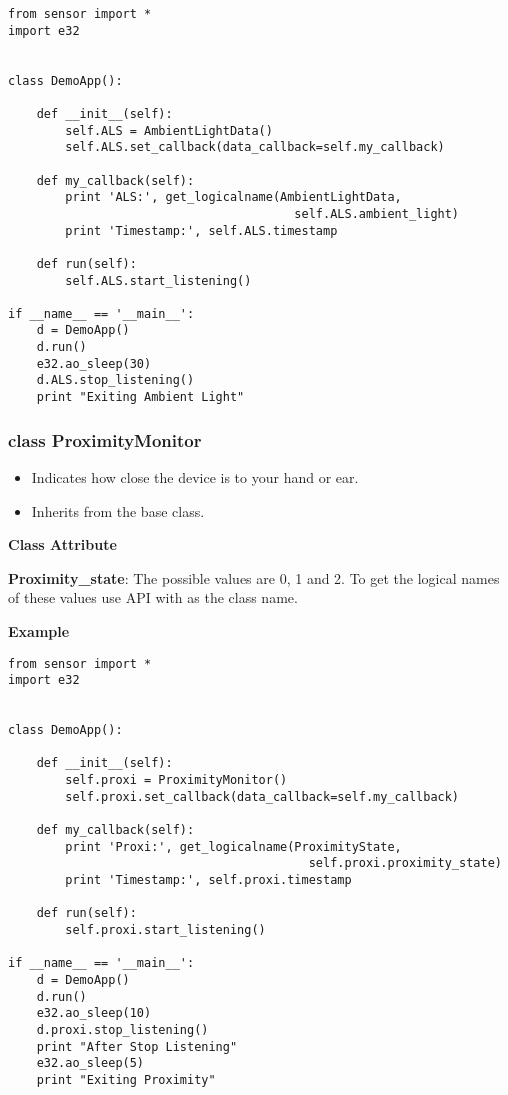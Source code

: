 \begin{verbatim}
from sensor import *
import e32


class DemoApp():

    def __init__(self):
        self.ALS = AmbientLightData()
        self.ALS.set_callback(data_callback=self.my_callback)

    def my_callback(self):
        print 'ALS:', get_logicalname(AmbientLightData,
                                        self.ALS.ambient_light)
        print 'Timestamp:', self.ALS.timestamp

    def run(self):
        self.ALS.start_listening()

if __name__ == '__main__':
    d = DemoApp()
    d.run()
    e32.ao_sleep(30)
    d.ALS.stop_listening()
    print "Exiting Ambient Light"
\end{verbatim}

\subsubsection{class ProximityMonitor}

\begin{itemize}
\item Indicates how close the device is to your hand or ear.
\item Inherits from the  base class.
\end{itemize}

{\bf Class Attribute} \break

{\bf Proximity_state}: The possible values are 0, 1 and 2. To get the logical names of these values use  API with  as the class name.

{\bf Example} \break

\begin{verbatim}
from sensor import *
import e32


class DemoApp():

    def __init__(self):
        self.proxi = ProximityMonitor()
        self.proxi.set_callback(data_callback=self.my_callback)

    def my_callback(self):
        print 'Proxi:', get_logicalname(ProximityState,
                                          self.proxi.proximity_state)
        print 'Timestamp:', self.proxi.timestamp

    def run(self):
        self.proxi.start_listening()

if __name__ == '__main__':
    d = DemoApp()
    d.run()
    e32.ao_sleep(10)
    d.proxi.stop_listening()
    print "After Stop Listening"
    e32.ao_sleep(5)
    print "Exiting Proximity"
\end{verbatim}

